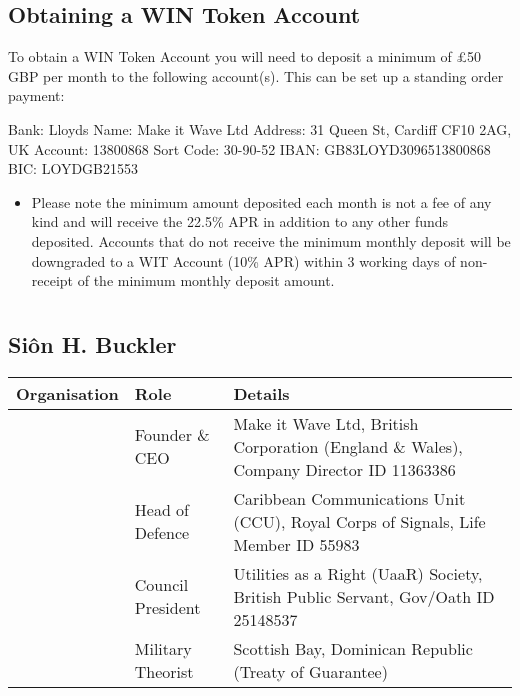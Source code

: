 \documentclass[letterpaper,10pt,english]{sphinxmanual}
\begin{document}
\section{Obtaining a WIN Token Account}
\label{\detokenize{win-detail:obtaining-a-win-token-account}}
To obtain a WIN Token Account you will need to deposit a minimum of £50 GBP per month to the following account(s). This can be set up a standing order payment:

Bank: Lloyds
Name: Make it Wave Ltd
Address: 31 Queen St, Cardiff CF10 2AG, UK
Account: 13800868
Sort Code: 30-90-52
IBAN: GB83LOYD3096513800868
BIC: LOYDGB21553
\begin{itemize}
\item {} 
Please note the minimum amount deposited each month is not a fee of any kind and will receive the 22.5\% APR in addition to any other funds deposited. Accounts that do not receive the minimum monthly deposit will be downgraded to a WIT Account (10\% APR) within 3 working days of non-receipt of the minimum monthly deposit amount.

\end{itemize}


\chapter{}
\label{\detokenize{index:document-author-s}}

\section{Siôn H. Buckler}
\label{\detokenize{index:sion-h-buckler}}

\begin{savenotes}\sphinxattablestart
\centering
\begin{tabulary}{\linewidth}[t]{|T|T|T|}
\hline
\sphinxstyletheadfamily 
Organisation
&\sphinxstyletheadfamily 
Role
&\sphinxstyletheadfamily 
Details
\\
\hline
\noindent{}
&
Founder \& CEO
&
Make it Wave Ltd, British Corporation (England \& Wales), Company Director ID 11363386
\\
\hline
\noindent{}
&
Head of Defence
&
Caribbean Communications Unit (CCU), Royal Corps of Signals, Life Member ID 55983
\\
\hline
\noindent{}
&
Council President
&
Utilities as a Right (UaaR) Society, British Public Servant, Gov/Oath ID 25148537
\\
\hline
\noindent{}
&
Military Theorist
&
Scottish Bay, Dominican Republic (Treaty of Guarantee)
\\
\hline
\end{tabulary}
\par
\sphinxattableend\end{savenotes}
\end{document}
